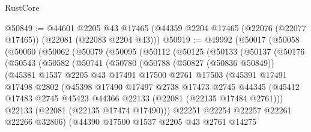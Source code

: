 \begin{lexlean}{RustCore}
\begin{coremodule}
@50849 := @44601
    @2205
    @43
    @17465
    (@44359 @2204 @17465 (@22076 (@22077 @17465)) (@22081 (@22083 @2204 @43)))
@50919 := @49992
    (@50017
      (@50058
        (@50060
          (@50062
            (@50079
              (@50095
                (@50112
                  (@50125
                    (@50133
                      (@50137
                        (@50176
                          (@50543
                            (@50582
                              (@50741
                                (@50780
                                  (@50788
                                    (@50827 (@50836 @50849))
                                    (@45381
                                      @1537
                                      @2205
                                      @43
                                      @17491
                                      @17500
                                      @2761
                                      @17503
                                      (@45391
                                        @17491
                                        @17498
                                        @2802
                                        (@45398
                                          @17490
                                          @17497
                                          @2738
                                          @17473
                                          @2745
                                          @44345
                                          (@45412
                                            @17483
                                            @2745
                                            @45423
                                            @44366
                                            @22133
                                            (@22081 (@22135 @17484 @2761)))
                                          @22133
                                          (@22081 (@22135 @17474 @17490)))
                                        @22251
                                        @22254
                                        @22257
                                        @22261
                                        @22266
                                        @32806)
                                      (@44390
                                        @17500
                                        @1537
                                        @2205
                                        @43
                                        @2761
                                        @14275

\end{coremodule}
\end{lexlean}

